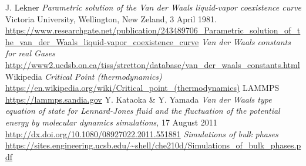 \documentclass[a4paper, 11pt]{article}
\begin{document}
\begin{thebibliography}{100}
   J. Lekner \emph{Parametric solution of the Van der Waals liquid-vapor coexistence curve} Victoria University, Wellington, New Zeland, 3 April 1981. \url{https://www.researchgate.net/publication/243489706_Parametric_solution_of_the_van_der_Waals_liquid-vapor_coexistence_curve}
   \emph{Van der Waals constants for real Gases} \url{http://www2.ucdsb.on.ca/tiss/stretton/database/van_der_waals_constants.html}
   Wikipedia \emph{Critical Point (thermodynamics)} \url{https://en.wikipedia.org/wiki/Critical_point_(thermodynamics)}
   LAMMPS \url{https://lammps.sandia.gov}
   Y. Kataoka \& Y. Yamada \emph{Van der Waals type equation of state for Lennard-Jones fluid and the fluctuation of the potential energy by molecular dynamics simulations}, 17 August 2011 \url{http://dx.doi.org/10.1080/08927022.2011.551881}
   \emph{Simulations of bulk phases} \url{https://sites.engineering.ucsb.edu/~shell/che210d/Simulations_of_bulk_phases.pdf}
\end{thebibliography}
\end{document}
